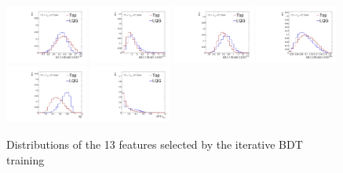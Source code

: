 \begin{figure}[]
\begin{center}
        \includegraphics[width=0.24\textwidth]{figures/toptagging/shapes/mass_ratio_13402320.pdf}
        \includegraphics[width=0.24\textwidth]{figures/toptagging/shapes/mass_ratio_33101340.pdf}
        \includegraphics[width=0.24\textwidth]{figures/toptagging/shapes/mass_ratio_33102320.pdf}
        \includegraphics[width=0.24\textwidth]{figures/toptagging/shapes/mass_ratio_33203340.pdf} \\ 
        \includegraphics[width=0.24\textwidth]{figures/toptagging/shapes/mass_fjTau32SD.pdf}
        \includegraphics[width=0.24\textwidth]{figures/toptagging/shapes/mass_fjHTTFRec.pdf}
        \caption{Distributions of the 13 features selected by the iterative BDT training}
        \label{figs:jets:features}
    \end{center}
\end{figure}

